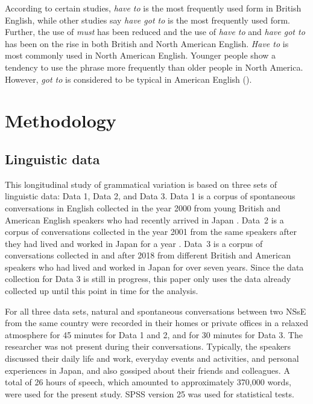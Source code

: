 \documentclass[output=paper,colorlinks,citecolor=brown]{langscibook}
\begin{document}
According to certain studies, \textit{have to} is the most frequently used form in British English, while other studies say \textit{have got to} is the most frequently used form. Further, the use of \textit{must} has been reduced and the use of \textit{have to} and \textit{have got to} has been on the rise in both British and North American English. \textit{Have to} is most commonly used in North American English. Younger people show a tendency to use the phrase more frequently than older people in North America. However, \textit{got to} is considered to be typical in American English (\cites[253--256]{Collins2005}[136--138]{Tagliamonte2013a}[142--145]{Tagliamonte2013b}).

\section{Methodology} \label{sec:hirano:4}%
\subsection{Linguistic data} %
\label{sec:hirano:4.1}

This longitudinal study of grammatical variation is based on three sets of linguistic data: Data 1, Data 2, and Data 3. Data 1 is a corpus of spontaneous conversations in English collected in the year 2000 from young British and American English speakers who had recently arrived in Japan \citep{HiranoBritain2020}. Data~2 is a corpus of conversations collected in the year 2001 from the same speakers after they had lived and worked in Japan for a year \citep{HiranoBritain2020}. Data~3 is a corpus of conversations collected in and after 2018 from different British and American speakers who had lived and worked in Japan for over seven years. Since the data collection for Data 3 is still in progress, this paper only uses the data already collected up until this point in time for the analysis.

For all three data sets, natural and spontaneous conversations between two NSsE from the same country were recorded in their homes or private offices in a relaxed atmosphere for 45 minutes for Data 1 and 2, and for 30 minutes for Data 3. The researcher was not present during their conversations. Typically, the speakers discussed their daily life and work, everyday events and activities, and personal experiences in Japan, and also gossiped about their friends and colleagues. A total of 26 hours of speech, which amounted to approximately 370,000 words, were used for the present study. SPSS version 25 was used for statistical tests.
\end{document}
